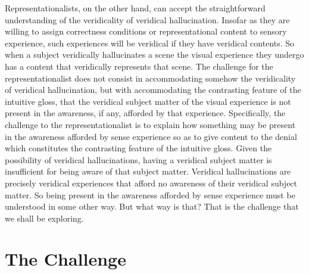 \documentclass[12pt]{article}
\begin{document}
Representationalists, on the other hand, can accept the straightforward understanding of the veridicality of veridical hallucination. Insofar as they are willing to assign correctness conditions or representational content to sensory experience, such experiences will be veridical if they have veridical contents. So when a subject veridically hallucinates a scene the visual experience they undergo has a content that veridically represents that scene. The challenge for the representationalist does not consist in accommodating somehow the veridicality of veridical hallucination, but with accommodating the contrasting feature of the intuitive gloss, that the veridical subject matter of the visual experience is not present in the awareness, if any, afforded by that experience. Specifically, the challenge to the representationalist is to explain how something may be present in the awareness afforded by sense experience so as to give content to the denial which constitutes the contrasting feature of the intuitive gloss. Given the possibility of veridical hallucinations, having a veridical subject matter is insufficient for being aware of that subject matter. Veridical hallucinations are precisely veridical experiences that afford no awareness of their veridical subject matter. So being present in the awareness afforded by sense experience must be understood in some other way. But what way is that? That is the challenge that we shall be exploring.


\section{The Challenge} %
\label{sec:the_challenge}




\end{document}
